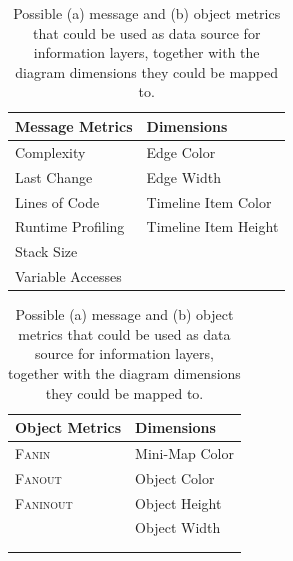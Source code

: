 \begin{table}[tb]
	\centering
	\footnotesize
	\begin{subtable}[t]{0.45\textwidth}
		\begin{tabular}{ll}
		\toprule[1.2pt]
		Message Metrics		& Dimensions 			\\
		\midrule
		Complexity			& Edge Color 			\\
		Last Change			& Edge Width			\\
		Lines of Code		& Timeline Item Color	\\
		Runtime Profiling	& Timeline Item Height	\\
		Stack Size			&						\\
		Variable Accesses	&						\\
		\bottomrule[1.2pt]
		\end{tabular}
		\caption[Message Metrics]{}
	\end{subtable}
	\qquad
	\begin{subtable}[t]{0.45\textwidth}
		\begin{tabular}{ll}
		\toprule[1.2pt]
		Object Metrics		& Dimensions 			\\
		\midrule
		\textsc{Fanin}		& Mini-Map Color		\\
		\textsc{Fanout}		& Object Color			\\
		\textsc{Faninout}	& Object Height			\\
		\hphantom{Runtime Profiling}	& Object Width			\\
							& \hphantom{Timeline Item Height} \\
							& \\
		\bottomrule[1.2pt]
		\end{tabular}
		\caption[Object Metrics]{}
	\end{subtable}
	\caption[Information Layers: Possible Metrics and Diagram Dimensions]{Possible (a) message and (b) object metrics that could be used as data source for information layers, together with the diagram dimensions they could be mapped to.}
	\label{t:ApproachLayers}
\end{table}